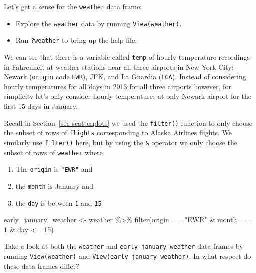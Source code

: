 \documentclass[
  letterpaper,
  DIV=11,
  numbers=noendperiod]{scrreprt}
\newenvironment{Shaded}{\begin{snugshade}}{\end{snugshade}}
\newcommand{\DecValTok}[1]{\textcolor[rgb]{0.68,0.00,0.00}{#1}}
\newcommand{\FunctionTok}[1]{\textcolor[rgb]{0.28,0.35,0.67}{#1}}
\newcommand{\NormalTok}[1]{\textcolor[rgb]{0.00,0.23,0.31}{#1}}
\newcommand{\OtherTok}[1]{\textcolor[rgb]{0.00,0.23,0.31}{#1}}
\newcommand{\SpecialCharTok}[1]{\textcolor[rgb]{0.37,0.37,0.37}{#1}}
\newcommand{\StringTok}[1]{\textcolor[rgb]{0.13,0.47,0.30}{#1}}
\providecommand{\tightlist}{%
  \setlength{\itemsep}{0pt}\setlength{\parskip}{0pt}}\usepackage{longtable,booktabs,array}
\theoremstyle{definition}
\theoremstyle{remark}
\begin{document}
Let's get a sense for the \texttt{weather} data frame:

\begin{itemize}
\tightlist
\item
  Explore the \texttt{weather} data by running \texttt{View(weather)}.
\item
  Run \texttt{?weather} to bring up the help file.
\end{itemize}

We can see that there is a variable called \texttt{temp} of hourly
temperature recordings in Fahrenheit at weather stations near all three
airports in New York City: Newark (\texttt{origin} code \texttt{EWR}),
JFK, and La Guardia (\texttt{LGA}). Instead of considering hourly
temperatures for all days in 2013 for all three airports however, for
simplicity let's only consider hourly temperatures at only Newark
airport for the first 15 days in January.

Recall in Section~\ref{sec-scatterplots} we used the \texttt{filter()}
function to only choose the subset of rows of \texttt{flights}
corresponding to Alaska Airlines flights. We similarly use
\texttt{filter()} here, but by using the \texttt{\&} operator we only
choose the subset of rows of \texttt{weather} where

\begin{enumerate}
\def\labelenumi{\arabic{enumi}.}
\tightlist
\item
  The \texttt{origin} is \texttt{"EWR"} and
\item
  the \texttt{month} is January and
\item
  the \texttt{day} is between \texttt{1} and \texttt{15}
\end{enumerate}

\begin{Shaded}
\begin{Highlighting}[]
\NormalTok{early\_january\_weather }\OtherTok{\textless{}{-}}\NormalTok{ weather }\SpecialCharTok{\%\textgreater{}\%} 
  \FunctionTok{filter}\NormalTok{(origin }\SpecialCharTok{==} \StringTok{"EWR"} \SpecialCharTok{\&}\NormalTok{ month }\SpecialCharTok{==} \DecValTok{1} \SpecialCharTok{\&}\NormalTok{ day }\SpecialCharTok{\textless{}=} \DecValTok{15}\NormalTok{)}
\end{Highlighting}
\end{Shaded}

\begin{tcolorbox}[enhanced jigsaw, colback=white, toprule=.15mm, bottomrule=.15mm, titlerule=0mm, title={{🎯} Learning Check 2.9}, leftrule=.75mm, arc=.35mm, left=2mm, colframe=quarto-callout-tip-color-frame, coltitle=black, opacitybacktitle=0.6, bottomtitle=1mm, colbacktitle=quarto-callout-tip-color!10!white, opacityback=0, toptitle=1mm, rightrule=.15mm, breakable]

Take a look at both the \texttt{weather} and
\texttt{early\_january\_weather} data frames by running
\texttt{View(weather)} and \texttt{View(early\_january\_weather)}. In
what respect do these data frames differ?

\end{tcolorbox}
\end{document}
